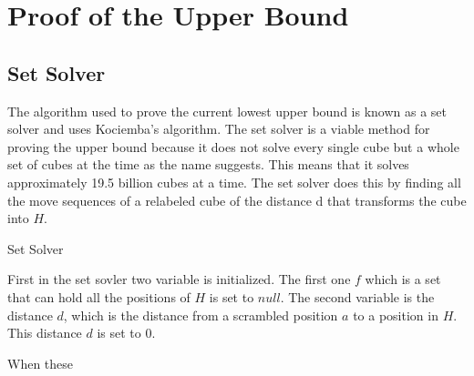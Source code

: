 \section{Proof of the Upper Bound}


\subsection{Set Solver}
The algorithm used to prove the current lowest upper bound is known as a set solver and uses Kociemba's algorithm. The set solver is a viable method for proving the upper bound because it does not solve every single cube but a whole set of cubes at the time as the name suggests. This means that it solves approximately 19.5 billion cubes at a time.
The set solver does this by finding all the move sequences of a relabeled cube of the distance d that transforms the cube into $H$. %

\begin{algorithm}[!h]                     
\caption{Set Solver \cite{rokicki09}}          
\label{alg:setSolver}        
\begin{algorithmic}[1]
				\ENDIF
			\ENDFOR
		\ENDIF
		\ENDIF
	\ENDIF
\ENDWHILE
\end{algorithmic}
\end{algorithm}

First in the set sovler two variable is initialized. The first one $f$ which is a set that can hold all the positions of $H$ is set to $null$. The second variable is the distance $d$, which is the distance from a scrambled position $a$ to a position in $H$. This distance $d$ is set to $0$.

When these 


